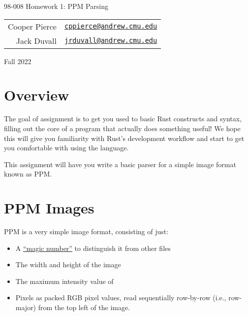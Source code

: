 \documentclass{article}
\newcommand{\longsemester}{Fall 2022}
\newcommand{\deptcode}{98}
\newcommand{\coursecode}{008}
\newcommand{\fullcoursecode}{\deptcode-\coursecode}
\begin{document}
\thispagestyle{empty}
\begin{center}
    \begin{minipage}{.85\textwidth}
        \centering
        {\huge {\fullcoursecode} Homework 1: PPM Parsing}

        \vspace{1em}

        \begin{tabular}{@{}rl@{}}
            Cooper Pierce & \href{mailto:cppierce@andrew.cmu.edu}{\texttt{cppierce@andrew.cmu.edu}} \\
            Jack Duvall & \href{mailto:jrduvall@andrew.cmu.edu}{\texttt{jrduvall@andrew.cmu.edu}} \\
        \end{tabular}

        \vspace{1em}

        \longsemester
    \end{minipage}
\end{center}

\section*{Overview}
The goal of assignment is to get you used to basic Rust constructs and syntax, filling out the core of a program that actually does something useful! We hope this will give you familiarity with Rust's development workflow and start to get you comfortable with using the language.

This assignment will have you write a basic parser for a simple image format known as PPM.

\section*{PPM Images}
PPM is a very simple image format, consisting of just:
\begin{itemize}
    \item A \href{https://en.wikipedia.org/wiki/List_of_file_signatures}{``magic number''} to distinguish it from other files
    \item The width and height of the image
    \item The maximum intensity value of
    \item Pixels as packed RGB pixel values, read sequentially row-by-row
        (i.e., row-major) from the top left of the image.
\end{itemize}
\end{document}

